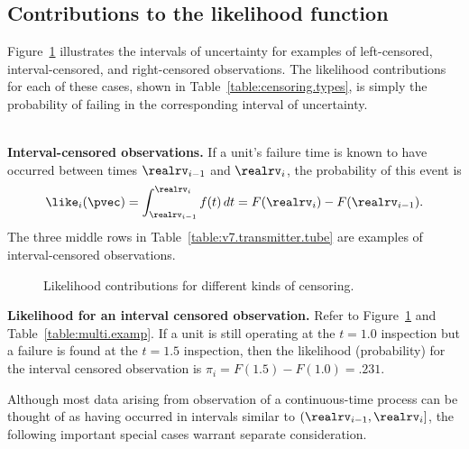 \subsection{Contributions to the likelihood function}
\label{section:likelihood.contributions}


Figure~\ref{figure:interval.probability.ps} illustrates the intervals
of uncertainty for examples of left-censored, interval-censored, and
right-censored observations.  The likelihood contributions for each of
these cases, shown in Table~\ref{table:censoring.types}, is simply the
probability of failing in the corresponding interval of uncertainty.


\mbox{  }\\
\noindent
\noindent
{\bf Interval-censored observations.}
If a unit's failure time is known to have occurred
between times $\realrv_{i-1}$ and $\realrv_{i}$, the probability
of this event is
\begin{equation}
\label{equation:interval.censored.likelihood}
\like_{i}(\pvec)=
\int_{\realrv_{i-1}}^{\realrv_{i}}f(t)\,dt=
F(\realrv_{i})-F(\realrv_{i-1}).
\end{equation}
The three middle rows in Table~\ref{table:v7.transmitter.tube} are
examples of interval-censored observations. 
\begin{figure}
\caption{Likelihood contributions for different kinds of censoring.}
\label{figure:interval.probability.ps}
\end{figure}

\begin{example}{\bf Likelihood for an interval censored observation.}
Refer to Figure~\ref{figure:interval.probability.ps} and
Table~\ref{table:multi.examp}. If a unit is still operating at the
$t=1.0$ inspection but a failure is found at the $t=1.5$ inspection,
then the likelihood (probability) for the interval censored
observation is $\pi_{i}=F(1.5) - F(1.0) = .231 $.
\end{example}

Although most data arising
from observation of a continuous-time process can be thought of as
having occurred in intervals similar to $(\realrv_{i-1},
\realrv_{i}]$, the following important special cases warrant separate
consideration.

